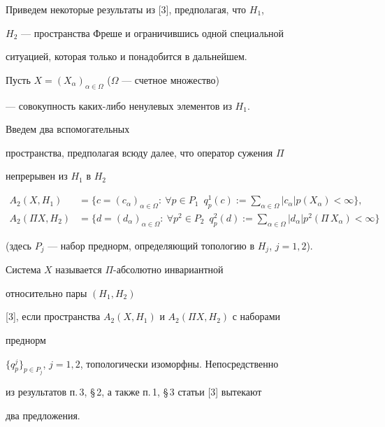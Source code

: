 Приведем некоторые результаты из [3], предполагая, что $H_1$,


$H_2$ --- пространства Фреше и ограничившись одной специальной 


ситуацией, которая только и понадобится в дальнейшем.





Пусть $X=(X_{\alpha})_{\alpha\in \Omega}$ ($\Omega$ --- счетное множество)


--- совокупность каких-либо ненулевых элементов из $H_1$.


Введем два вспомогательных


пространства, предполагая всюду далее, что оператор сужения $\Pi$


непрерывен из $H_1$ в $H_2$


\begin{align*}


A_2(X,H_1)&=\bigg\{c=(c_{\alpha})_{\alpha\in\Omega}:\ \forall p\in P_1\ 


\; q^1_p(c):=\sum\limits_{\alpha \in\Omega}|c_{\alpha }|p(X_{\alpha


})<\infty\bigg\}, \\


%


A_2(\Pi X,H_2)&=\bigg\{d=(d_{\alpha})_{\alpha\in\Omega}:\ \forall p^2\in


P_2\ \; q^2_p(d):=\sum_{\alpha\in\Omega}|d_{\alpha}|p^2(\Pi\,X_{\alpha})


<\infty\bigg\}


\end{align*}


(здесь $P_j$ --- набор преднорм, определяющий топологию в $H_j$, $j=1,2$).


Система $X$ называется $\Pi$-абсолютно инвариантной


относительно пары $(H_1,H_2)$


[3], если пространства $A_2(X,H_1)$ и $A_2(\Pi X,H_2)$ с наборами


преднорм


$\{q^j_p\}_{p\in P_j}$, $j=1,2$, топологически изоморфны. Непосредственно


из результатов п.\,3, \S\,2, а также п.\,1, \S\,3 статьи [3] вытекают


два предложения.








